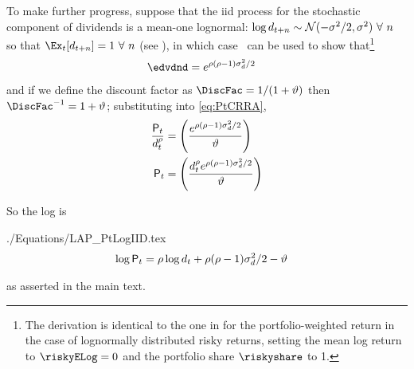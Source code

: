 \documentclass{\handout}
\begin{document}
\providecommand{\riskyvar}{}
\renewcommand{\riskyvar}{\sigma_{\dvdnd}^{2}}
To make further progress, suppose that the iid process for the stochastic component of dividends is a mean-one lognormal: $\log d_{t+n} \sim \mathcal{N}(-\sigma^{2}/2,\sigma^{2})~\forall~n$ so that $\Ex_{t}[\dvdnd_{t+n}]=1~\forall~n$ (see \ELogNormMeanOne), in which case \ELogNormTimes~can be used to show that\footnote{
  The derivation is identical to the one in  for the portfolio-weighted return in the case of lognormally distributed risky returns, setting the mean log return to $\riskyELog=0$ and the portfolio share $\riskyshare$ to 1.
  }
\begin{equation}\begin{gathered}\begin{aligned}
 \edvdnd & =  e^{\CRRA(\CRRA-1)\riskyvar/2} \label{eq:edvdndSimple}
\end{aligned}\end{gathered}\end{equation}
and if we define the discount factor as $\DiscFac = 1/(1+\timeRate)$ then $\DiscFac^{-1}=1+\timeRate$; substituting into \eqref{eq:PtCRRA}, 
\begin{equation}\begin{gathered}\begin{aligned}
  \frac{\Price_{t}}{\dvdnd_{t}^{\CRRA}} 
 & =  \left(\frac{e^{\CRRA(\CRRA-1)\riskyvar/2}}{\timeRate}\right)
\\ \Price_{t} & =  \left(\frac{\dvdnd_{t}^{\CRRA} e^{\CRRA(\CRRA-1)\riskyvar/2}}{\timeRate}\right) \label{eq:PmeanOneLognorm}
\end{aligned}\end{gathered}\end{equation}

So the log is
\begin{verbatimwrite}{./Equations/LAP_PtLogIID.tex}
\begin{equation}\begin{gathered}\begin{aligned}
  \log \Price_{t} & =  \CRRA \log \dvdnd_{t} + \CRRA(\CRRA-1)\riskyvar/2 - \timeRate \label{eq:PtLogIID}
\end{aligned}\end{gathered}\end{equation}
\end{verbatimwrite}

as asserted in the main text.
\end{document}
